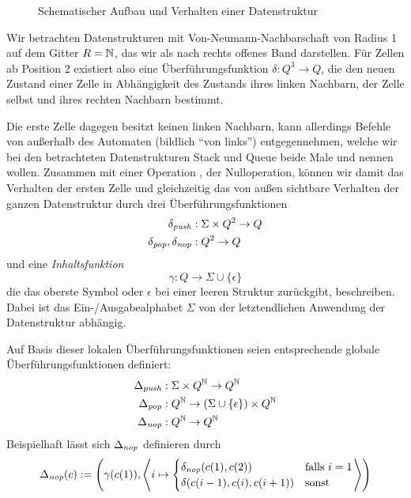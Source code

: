 \documentclass{article}
\begin{document}
\begin{figure}[h]
    \centering
    \caption{Schematischer Aufbau und Verhalten einer Datenstruktur}
\end{figure}
Wir betrachten Datenstrukturen mit Von-Neumann-Nachbarschaft von Radius 1 auf dem Gitter $R = \mathbb{N}$, das wir als nach rechts offenes Band darstellen. Für Zellen ab Position 2 existiert also eine Überführungsfunktion $\delta : Q^3 \rightarrow Q$, die den neuen Zustand einer Zelle in Abhängigkeit des Zustands ihres linken Nachbarn, der Zelle selbst und ihres rechten Nachbarn bestimmt.

Die erste Zelle dagegen besitzt keinen linken Nachbarn, kann allerdings Befehle von außerhalb des Automaten (bildlich "`von links"') entgegennehmen, welche wir bei den betrachteten Datenstrukturen Stack und Queue beide Male \push und \pop nennen wollen. Zusammen mit einer Operation \nop, der Nulloperation, können wir damit das Verhalten der ersten Zelle und gleichzeitig das von außen sichtbare Verhalten der ganzen Datenstruktur durch drei Überführungsfunktionen
\begin{align*}
    \delta_{\mathit{push}} &: \Sigma \times Q^2 \rightarrow Q \\
    \delta_{\mathit{pop}}, \delta_{\mathit{nop}} &: Q^2 \rightarrow Q
\end{align*}
und eine \emph{Inhaltsfunktion}
\[ \gamma : Q \rightarrow \Sigma \cup \{\epsilon\} \]
die das oberste Symbol oder $\epsilon$ bei einer leeren Struktur zurückgibt, beschreiben. Dabei ist das Ein-/Ausgabealphabet $\Sigma$ von der letztendlichen Anwendung der Datenstruktur abhängig.

Auf Basis dieser lokalen Überführungsfunktionen seien entsprechende globale Überführungsfunktionen definiert:
\begin{align*}
    \Delta_{\mathit{push}} &: \Sigma \times Q^{\mathbb{N}} \rightarrow Q^{\mathbb{N}} \\
    \Delta_{\mathit{pop}} &: Q^{\mathbb{N}} \rightarrow (\Sigma \cup \{\epsilon\}) \times Q^{\mathbb{N}} \\
    \Delta_{\mathit{nop}} &: Q^{\mathbb{N}} \rightarrow Q^{\mathbb{N}}
\end{align*}
Beispielhaft lässt sich $\Delta_\mathit{nop}$ definieren durch
\[ \Delta_\mathit{nop}(c) := \left(\gamma(c(1)), \left< i \mapsto \begin{cases}
        \delta_\mathit{nop}(c(1), c(2)) &\text{falls } i = 1 \\
        \delta(c(i-1), c(i), c(i+1)) &\text{sonst }
\end{cases} \right> \right) \]
\end{document}
